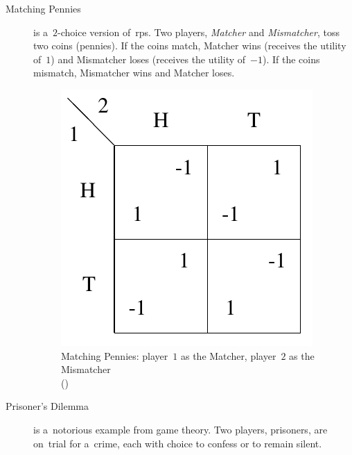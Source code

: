 \begin{description}
  \item [Matching Pennies] is a~$2$-choice version of~\acrshort{rps}.
    Two players, \emph{Matcher} and \emph{Mismatcher}, toss two coins (pennies).
    If the coins match, Matcher wins (receives the utility of~$1$) and Mismatcher loses (receives the utility of~$-1$).
    If the coins mismatch, Mismatcher wins and Matcher loses.
    \begin{figure}[H]
      \centering
      \includegraphics[width=.3\textwidth]{../img/matching-pennies.png}
      \caption[Matching Pennies]{Matching Pennies: player~$1$ as the Matcher, player~$2$ as the Mismatcher \\(\cite{AGT07})}
      \label{fig:matching-pennies}
    \end{figure}

  \item [Prisoner's Dilemma] is a~notorious example from game theory.
    Two players, prisoners, are on~trial for a~crime, each with choice to confess or to remain silent.


\end{description}
